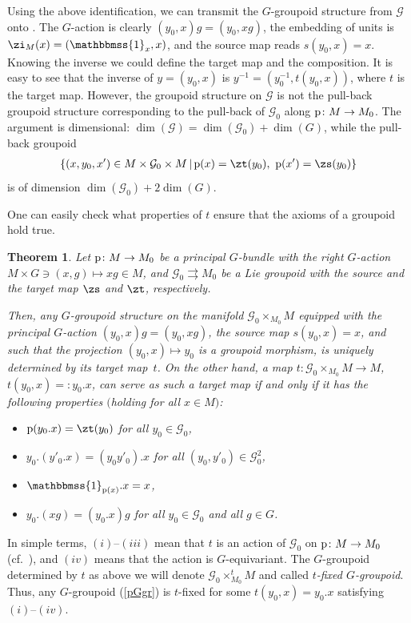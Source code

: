 \documentclass[10pt,a4paper]{amsart}
\newcommand{\Id}{\mathbbmss{1}}
\newcommand{\rmp}{\textnormal{p}}
\newcommand{\ti}{\times}
\def\cG{\mathcal{G}}
\numberwithin{equation}{section}
\newtheorem{Theorem}{Theorem}[section]
\begin{document}
Using the above identif\/ication, we can transmit the $G$-groupoid structure from $\cG$ onto \smash{$\cG_0\times_{M_0}M$}. The $G$-action is clearly $(y_0,x)g=(y_0,xg)$, the embedding of units is $\zi_M(x)=(\Id_x,x)$, and the source map reads $s(y_0,x)=x$. Knowing the inverse we could def\/ine the target map and the composition. It is easy to see that the inverse of $y=(y_0,x)$ is $y^{-1}=(y_0^{-1},t(y_0,x))$, where $t$ is the target map. However, the groupoid structure on $\cG$ is not the pull-back groupoid structure corresponding to the pull-back of $\cG_0$ along $\rmp\colon M\to M_0$. The argument is dimensional: $\dim(\cG)=\dim(\cG_0)+\dim(G)$, while the pull-back groupoid
\begin{gather*}\{(x,y_0,x')\in M\ti\cG_0\ti M\,|\, \rmp(x)=\zt(y_0),\ \rmp(x')=\zs(y_0)\}\end{gather*}
is of dimension $\dim(\cG_0)+2\dim(G)$.

One can easily check what properties of $t$ ensure that the axioms of a groupoid hold true.
\begin{Theorem}\label{generalsplit} Let $\rmp\colon M\to M_0$ be a principal $G$-bundle with the right $G$-action $M\ti G\ni(x,g)\mapsto xg\in M$, and $\cG_0\rightrightarrows M_0$ be a Lie groupoid with the source and the target map ${\zs}$ and ${\zt}$, respectively.

Then, any $G$-groupoid structure on the manifold $\cG_0\times_{M_0}M$ equipped with the principal $G$-action $(y_0,x)g=(y_0,xg)$, the source map $s(y_0,x)=x$, and such that the projection $(y_0,x)\mapsto y_0$ is a groupoid morphism, is uniquely determined by its target map~$t$. On the other hand, a map $t\colon \cG_0\times_{M_0}M\to M$, $t(y_0,x)=:y_0. x$, can serve as such a target map if and only if it has the following properties $($holding for all $x\in M)$:
\begin{itemize}\itemsep=0pt
\item[$(i)$] $\rmp(y_0.x)=\zt(y_0)$ for all $y_0\in\cG_0$,
\item[$(ii)$] $y_0.(y'_0.x)=(y_0y'_0).x$ for all $(y_0,y'_0)\in\cG_0^2$,
\item[$(iii)$] $\Id_{\rmp(x)}.x=x$,
\item[$(iv)$] $y_0.(xg)=(y_0.x)g$ for all $y_0\in\cG_0$ and all $g\in G$.
\end{itemize}
\end{Theorem}
In simple terms, $(i)$--$(iii)$ mean that $t$ is an action of $\cG_0$ on $\rmp\colon M\to M_0$ (cf.\ \cite[De\-f\/i\-ni\-tion~1.6.1]{Mackenzie2005}), and $(iv)$ means that the action is $G$-equivariant. The $G$-groupoid determined by $t$ as above we will denote $\cG_0\times_{M_0}^t M$ and called \emph{$t$-fixed $G$-groupoid}. Thus, any $G$-groupoid (\ref{pGgr}) is $t$-f\/ixed for some $t(y_0,x)=y_0.x$ satisfying $(i)$--$(iv)$.
\end{document}
